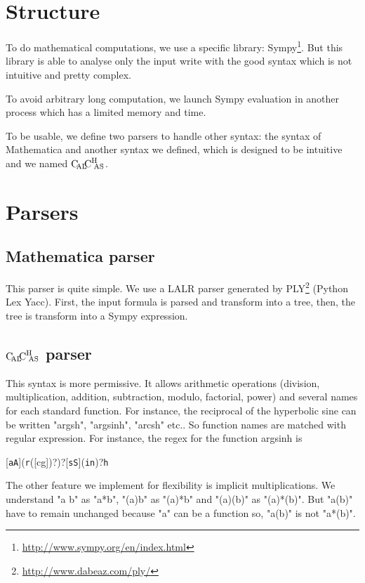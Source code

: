 \section{Structure}

To do mathematical computations, we use a specific library: Sympy\footnote{\url{http://www.sympy.org/en/index.html}}. But this library is able to analyse only the input write with the good syntax which is not intuitive and pretty complex.

To avoid arbitrary long computation, we launch Sympy evaluation in another process which has a limited memory and time.

To be usable, we define two parsers to handle other syntax: the syntax of Mathematica and another syntax we defined, which is designed to be intuitive and we named $\text{C}\hspace{-2pt}_{\text{AL}}\hspace{-3pt}\text{C}^{\text{H}}{\hspace{-4pt}}_\text{AS}$.

\section{Parsers}

\subsection{Mathematica parser}

This parser is quite simple. We use a LALR parser generated by PLY\footnote{\url{http://www.dabeaz.com/ply/}} (Python Lex Yacc). First, the input formula is parsed and transform into a tree, then, the tree is transform into a Sympy expression.

\subsection{\texorpdfstring{$\text{C}\hspace{-2pt}_{\text{AL}}\hspace{-3pt}\text{C}^{\text{H}}{\hspace{-4pt}}_\text{AS}$}{CalChAS} parser}

This syntax is more permissive. It allows arithmetic operations (division, multiplication, addition, subtraction, modulo, factorial, power) and several names for each standard function. For instance, the 
reciprocal of the hyperbolic sine can be written "argsh", "argsinh", "arcsh" etc.. So function names are matched with regular expression. For instance, the regex for the function argsinh is \begin{center}[\texttt{aA}](\texttt{r}([cg])?)?[\texttt{sS}](\texttt{in})?\texttt{h}\end{center}

The other feature we implement for flexibility is implicit multiplications. We understand "a b" as "a*b", "(a)b" as "(a)*b" and "(a)(b)" as "(a)*(b)". But "a(b)" have to remain unchanged because "a" can be a function so, "a(b)" is not "a*(b)".

